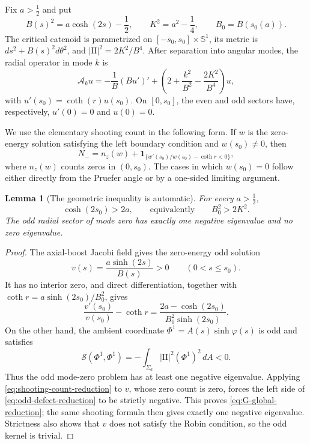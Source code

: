 \documentclass[11pt]{article}
\newtheorem{lemma}[theorem]{Lemma}
\begin{document}
Fix $a>\frac12$ and put
\[
 B(s)^2=a\cosh(2s)-\frac12,
 \qquad K^2=a^2-\frac14,
 \qquad B_0=B(s_0(a)).
\]
The critical catenoid is parametrized on
$[-s_0,s_0]\times\mathbb S^1$, its metric is
$ds^2+B(s)^2d\theta^2$, and
$|\mathrm{II}|^2=2K^2/B^4$.  After separation into angular modes,
the radial operator in mode $k$ is
\begin{equation}\label{eq:radial-operator-reduction}
 \mathcal A_k u
 =-\frac1B(Bu')'
  +\left(2+\frac{k^2}{B^2}-\frac{2K^2}{B^4}\right)u,
\end{equation}
with $u'(s_0)=\coth(r)u(s_0)$.  On $[0,s_0]$, the even and odd
sectors have, respectively, $u'(0)=0$ and $u(0)=0$.

We use the elementary shooting count in the following form.  If $w$ is
the zero-energy solution satisfying the left boundary condition and
$w(s_0)\ne0$, then
\begin{equation}\label{eq:shooting-count-reduction}
 N_-=n_z(w)+
 \mathbf 1_{\{w'(s_0)/w(s_0)-\coth r<0\}},
\end{equation}
where $n_z(w)$ counts zeros in $(0,s_0)$.  The cases in which
$w(s_0)=0$ follow either directly from the Pruefer angle or by a
one-sided limiting argument.

\begin{lemma}[The geometric inequality is automatic]
For every $a>\frac12$,
\begin{equation}\label{eq:G-global-reduction}
 \cosh(2s_0)>2a,
 \qquad\text{equivalently}\qquad B_0^2>2K^2.
\end{equation}
The odd radial sector of mode zero has exactly one negative eigenvalue
and no zero eigenvalue.
\end{lemma}

\begin{proof}
The axial-boost Jacobi field gives the zero-energy odd solution
\[
 v(s)=\frac{a\sinh(2s)}{B(s)}>0\qquad(0<s\le s_0).
\]
It has no interior zero, and direct differentiation, together with
$\coth r=a\sinh(2s_0)/B_0^2$, gives
\begin{equation}\label{eq:odd-defect-reduction}
 \frac{v'(s_0)}{v(s_0)}-\coth r
 =\frac{2a-\cosh(2s_0)}{B_0^2\sinh(2s_0)}.
\end{equation}
On the other hand, the ambient coordinate
$\Phi^1=A(s)\sinh\varphi(s)$ is odd and satisfies
\[
 \mathcal S(\Phi^1,\Phi^1)
 =-\int_{\Sigma_a}|\mathrm{II}|^2(\Phi^1)^2\,dA<0.
\]
Thus the odd mode-zero problem has at least one negative eigenvalue.
Applying \eqref{eq:shooting-count-reduction} to $v$, whose zero count
is zero, forces the left side of \eqref{eq:odd-defect-reduction} to be
strictly negative.  This proves \eqref{eq:G-global-reduction}; the same
shooting formula then gives exactly one negative eigenvalue.  Strictness
also shows that $v$ does not satisfy the Robin condition, so the odd
kernel is trivial.
\end{proof}
\end{document}
